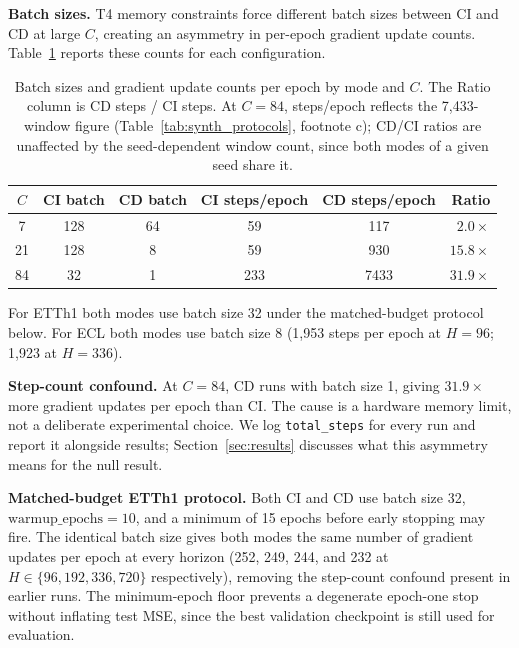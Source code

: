 \documentclass[10pt]{article} %
\begin{document}
    \textbf{Batch sizes.} T4 memory constraints force different batch sizes between CI and CD at large $C$, creating an
    asymmetry in per-epoch gradient update counts. Table~\ref{tab:batch_sizes} reports these counts for each configuration.

    \begin{table}[htbp]
        \centering
        \caption{Batch sizes and gradient update counts per epoch by mode and $C$. The Ratio column is CD steps / CI
        steps. At $C=84$, steps/epoch reflects the 7,433-window figure (Table~\ref{tab:synth_protocols}, footnote c);
        CD/CI ratios are unaffected by the seed-dependent window count, since both modes of a given seed share it.}
        \label{tab:batch_sizes}
        \begin{tabular}{cccccr}
            \toprule
            $C$ & CI batch & CD batch & CI steps/epoch & CD steps/epoch & Ratio        \\
            \midrule
            7   & 128      & 64       & 59             & 117            & $2.0\times$  \\
            21  & 128      & 8        & 59             & 930            & $15.8\times$ \\
            84  & 32       & 1        & 233            & 7433           & $31.9\times$ \\
            \bottomrule
        \end{tabular}
    \end{table}

    For ETTh1 both modes use batch size 32 under the matched-budget protocol below. For ECL both modes use batch size 8
    (1,953 steps per epoch at $H = 96$; 1,923 at $H = 336$).

    \textbf{Step-count confound.} At $C = 84$, CD runs with batch size 1, giving $31.9\times$ more gradient updates per
    epoch than CI. The cause is a hardware memory limit, not a deliberate experimental choice. We log \texttt{total\_steps}
    for every run and report it alongside results; Section~\ref{sec:results} discusses what this asymmetry means for the
    null result.

    \textbf{Matched-budget ETTh1 protocol.} Both CI and CD use batch size 32, $\text{warmup\_epochs} = 10$, and a minimum
    of 15 epochs before early stopping may fire. The identical batch size gives both modes the same number of gradient updates
    per epoch at every horizon (252, 249, 244, and 232 at $H \in \{96, 192, 336, 720\}$ respectively), removing the step-count
    confound present in earlier runs. The minimum-epoch floor prevents a degenerate epoch-one stop without inflating test MSE,
    since the best validation checkpoint is still used for evaluation.
\end{document}
